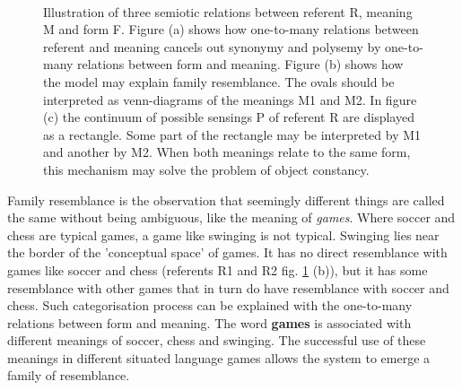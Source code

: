 \begin{figure}
\centering
{}
\\
\caption{Illustration of three semiotic relations between referent R, meaning M and form F. Figure (a) shows how one-to-many relations between referent and meaning cancels out synonymy and polysemy by one-to-many relations between form and meaning. Figure (b) shows how the model may explain family resemblance. The ovals should be interpreted as venn-diagrams of the meanings M1 and M2. In figure (c) the continuum of possible sensings P of referent R are displayed as a rectangle. Some part of the rectangle may be interpreted by M1 and another by M2. When both meanings relate to the same form, this mechanism may solve the problem of object constancy.}
\label{f:disc:semiotic1}
\end{figure}


 Family resemblance \citep{wittgenstein:1958} is the observation that seemingly different things are called the same without being ambiguous, like the meaning of {\em games}. Where soccer and chess are typical games, a game like swinging is not typical. Swinging lies near the border of the 'conceptual space' of games. It has no direct resemblance with games like soccer  and chess (referents R1 and R2 fig. \ref{f:disc:semiotic1} (b)), but it has some resemblance with other games that in turn do have resemblance with soccer and chess. Such categorisation process can be explained with the one-to-many relations between form and meaning. The word {\bf games} is associated with different meanings of soccer, chess and swinging. The successful use of these meanings in different situated language games allows the system to emerge a family of resemblance.


